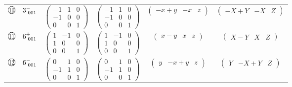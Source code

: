 \documentclass[fleqn,10pt,landscape]{jsarticle}
\begin{document}
\begin{center}
\begin{longtable}{lcccc}
$ {\ooalign{\hfil\resizebox{.8\width}{\height}{10}\hfil\crcr\raise.1ex\hbox{\large$\bigcirc$}}}\quad 3^{-}_{\,\,001} $ & $ \begin{pmatrix} -1 & 1 & 0 \\ -1 & 0 & 0 \\ 0 & 0 & 1 \end{pmatrix} $ & $ \begin{pmatrix} -1 & 1 & 0 \\ -1 & 0 & 0 \\ 0 & 0 & 1 \end{pmatrix} $ & $ \begin{pmatrix} - x + y & - x & z \end{pmatrix} $ & $ \begin{pmatrix} - X + Y & - X & Z \end{pmatrix} $ \\
$ {\ooalign{\hfil\resizebox{.8\width}{\height}{11}\hfil\crcr\raise.1ex\hbox{\large$\bigcirc$}}}\quad 6^{+}_{\,\,001} $ & $ \begin{pmatrix} 1 & -1 & 0 \\ 1 & 0 & 0 \\ 0 & 0 & 1 \end{pmatrix} $ & $ \begin{pmatrix} 1 & -1 & 0 \\ 1 & 0 & 0 \\ 0 & 0 & 1 \end{pmatrix} $ & $ \begin{pmatrix} x - y & x & z \end{pmatrix} $ & $ \begin{pmatrix} X - Y & X & Z \end{pmatrix} $ \\
$ {\ooalign{\hfil\resizebox{.8\width}{\height}{12}\hfil\crcr\raise.1ex\hbox{\large$\bigcirc$}}}\quad 6^{-}_{\,\,001} $ & $ \begin{pmatrix} 0 & 1 & 0 \\ -1 & 1 & 0 \\ 0 & 0 & 1 \end{pmatrix} $ & $ \begin{pmatrix} 0 & 1 & 0 \\ -1 & 1 & 0 \\ 0 & 0 & 1 \end{pmatrix} $ & $ \begin{pmatrix} y & - x + y & z \end{pmatrix} $ & $ \begin{pmatrix} Y & - X + Y & Z \end{pmatrix} $ \\
\end{longtable}
\end{center}
\end{document}

